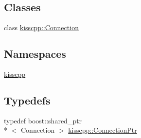 \subsection*{Classes}
\begin{DoxyCompactItemize}
\item 
class \hyperlink{a00022}{kisscpp\-::\-Connection}
\end{DoxyCompactItemize}
\subsection*{Namespaces}
\begin{DoxyCompactItemize}
\item 
\hyperlink{a00089}{kisscpp}
\end{DoxyCompactItemize}
\subsection*{Typedefs}
\begin{DoxyCompactItemize}
\item 
typedef boost\-::shared\-\_\-ptr\\*
$<$ Connection $>$ \hyperlink{a00089_a4632e92aebdc8fa1c220da260469cbb2}{kisscpp\-::\-Connection\-Ptr}
\end{DoxyCompactItemize}
